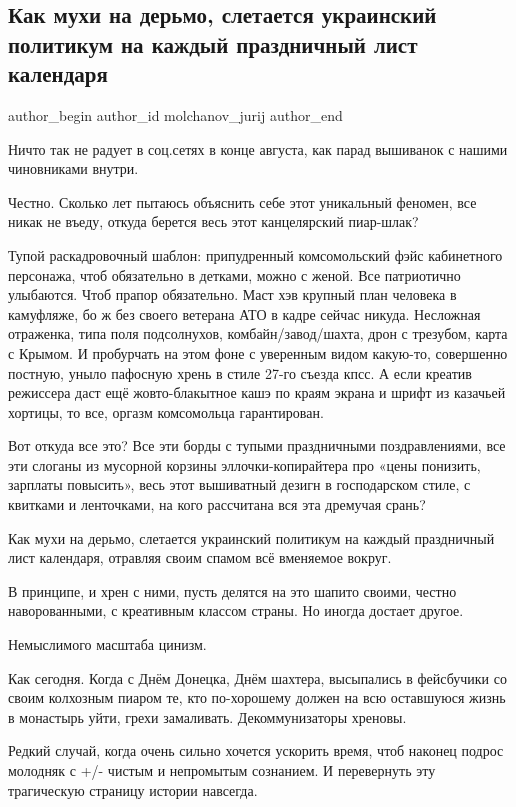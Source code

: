  
 
 
 
 
 
\subsection{Как мухи на дерьмо, слетается украинский политикум на каждый праздничный лист календаря}
\label{sec:29_08_2021.fb.molchanov_jurij.1.pokazuha}
 
\ifcmt
 author_begin
   author_id molchanov_jurij
 author_end
\fi

Ничто так не радует в соц.сетях в конце августа, как парад вышиванок с нашими
чиновниками внутри. 

Честно. Сколько лет пытаюсь объяснить себе этот уникальный феномен, все никак
не въеду, откуда берется весь этот канцелярский пиар-шлак?

Тупой раскадровочный шаблон: припудренный комсомольский фэйс кабинетного
персонажа, чтоб обязательно в детками, можно с женой. Все патриотично
улыбаются. Чтоб прапор обязательно. Маст хэв крупный план человека в камуфляже,
бо ж без своего ветерана АТО в кадре сейчас никуда. Несложная отраженка, типа
поля подсолнухов, комбайн/завод/шахта, дрон с трезубом, карта с Крымом. И
пробурчать на этом фоне с уверенным видом какую-то, совершенно постную, уныло
пафосную хрень в стиле 27-го съезда кпсс. А если креатив режиссера даст ещё
жовто-блакытное кашэ по краям экрана и шрифт из казачьей хортицы, то все,
оргазм комсомольца гарантирован.

Вот откуда все это? Все эти борды с тупыми праздничными поздравлениями, все эти
слоганы из мусорной корзины эллочки-копирайтера про «цены понизить, зарплаты
повысить», весь этот вышиватный дезигн в господарском стиле, с квитками и
ленточками, на кого рассчитана вся эта дремучая срань?

Как мухи на дерьмо, слетается украинский политикум на каждый праздничный лист
календаря, отравляя своим спамом всё вменяемое вокруг.

В принципе, и хрен с ними, пусть делятся на это шапито своими, честно
наворованными, с креативным классом страны. Но иногда достает другое. 

Немыслимого масштаба цинизм.

Как сегодня. Когда с Днём Донецка, Днём шахтера, высыпались в фейсбучики со
своим колхозным пиаром те, кто по-хорошему должен на всю оставшуюся жизнь в
монастырь уйти, грехи замаливать. Декоммунизаторы хреновы.

Редкий случай, когда очень сильно хочется ускорить время, чтоб наконец подрос
молодняк с +/- чистым и непромытым сознанием. И перевернуть эту трагическую
страницу истории навсегда.
